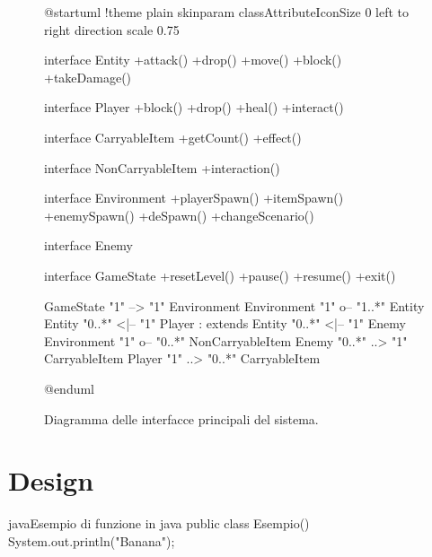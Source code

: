 \documentclass[a4paper, italian, 11pt, oneside]{report}
\begin{document}
\begin{figure}[htbp]
  \centering
  \begin{plantuml}
      @startuml
      !theme plain
      skinparam classAttributeIconSize 0
      left to right direction
      scale 0.75

      interface Entity {
        +attack()
        +drop()
        +move()
        +block()
        +takeDamage()
      }

      interface Player {
          +block()
          +drop()
          +heal()
          +interact()
      }

      interface CarryableItem {
          +getCount()
          +effect()
      }

      interface NonCarryableItem {
          +interaction()
      }

      interface Environment {
          +playerSpawn()
          +itemSpawn()
          +enemySpawn()
          +deSpawn()
          +changeScenario()
      }

      interface Enemy {

      }

      interface GameState {
          +resetLevel()
          +pause()
          +resume()
          +exit()
      }

      GameState "1" --> "1" Environment
      Environment "1" o-- "1..*" Entity
      Entity "0..*" <|-- "1" Player : extends
      Entity "0..*" <|-- "1" Enemy
      Environment "1" o-- "0..*" NonCarryableItem
      Enemy "0..*" ..> "1" CarryableItem
      Player "1" ..> "0..*" CarryableItem

      @enduml
  \end{plantuml}
  \caption{Diagramma delle interfacce principali del sistema.}
  \label{fig:architettura-interfacce}
\end{figure}


\chapter{Design}

\begin{mintedcodebox}{java}{Esempio di funzione in java}
  public class Esempio() {
    System.out.println("Banana");
  }
\end{mintedcodebox}
\end{document}
